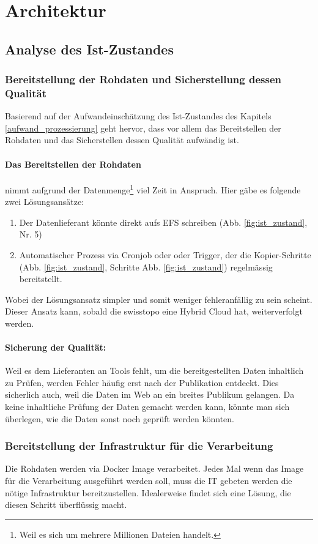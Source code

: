 \section{Architektur}

\subsection{Analyse des Ist-Zustandes}
\subsubsection{Bereitstellung der Rohdaten und Sicherstellung dessen Qualität}
Basierend auf der Aufwandeinschätzung des Ist-Zustandes des Kapitels \ref{aufwand_prozessierung} geht hervor, dass vor allem das Bereitstellen der Rohdaten und das Sicherstellen dessen Qualität aufwändig ist. 

\paragraph{Das Bereitstellen der Rohdaten} nimmt aufgrund der Datenmenge\footnote{Weil es sich um mehrere Millionen Dateien handelt.} viel Zeit in Anspruch. Hier gäbe es folgende zwei Lösungsansätze:
\begin{enumerate}
\item Der Datenlieferant könnte direkt aufs EFS schreiben (Abb. \ref{fig:ist_zustand}, Nr. 5)
\item Automatischer Prozess via Cronjob oder oder Trigger, der die Kopier-Schritte (Abb. \ref{fig:ist_zustand}, Schritte Abb. \ref{fig:ist_zustand}) regelmässig bereitstellt.
\end{enumerate}

Wobei der Lösungsansatz simpler und somit weniger fehleranfällig zu sein scheint. Dieser Ansatz kann, sobald die swisstopo eine Hybrid Cloud hat, weiterverfolgt werden.

\paragraph{Sicherung der Qualität:} Weil es dem Lieferanten an Tools fehlt, um die bereitgestellten Daten inhaltlich zu Prüfen, werden Fehler 
häufig erst nach der Publikation entdeckt. Dies sicherlich auch, weil die Daten im Web an ein breites Publikum gelangen. Da keine inhaltliche Prüfung der Daten gemacht werden kann, könnte man sich überlegen, wie die Daten sonst noch geprüft werden könnten.

\subsubsection{Bereitstellung der Infrastruktur für die Verarbeitung}
Die Rohdaten werden via Docker Image verarbeitet. Jedes Mal wenn das Image für die Verarbeitung ausgeführt werden soll, muss die IT gebeten werden die nötige Infrastruktur bereitzustellen. Idealerweise findet sich eine Lösung, die diesen Schritt überflüssig macht.


